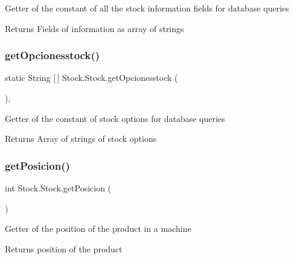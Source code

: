 Getter of the constant of all the stock information fields for database queries

\begin{DoxyReturn}{Returns}
Fields of information as array of strings 
\end{DoxyReturn}
\mbox{\label{class_stock_1_1_stock_a9418c579ab8866675c103afb3908133e}} 
\subsubsection{\texorpdfstring{get\+Opcionesstock()}{getOpcionesstock()}}
{\footnotesize\ttfamily static String \mbox{[}$\,$\mbox{]} Stock.\+Stock.\+get\+Opcionesstock (\begin{DoxyParamCaption}{ }\end{DoxyParamCaption})\hspace{0.3cm}{\ttfamily [inline]}, {\ttfamily [static]}}

Getter of the constant of stock options for database queries

\begin{DoxyReturn}{Returns}
Array of strings of stock options 
\end{DoxyReturn}
\mbox{\label{class_stock_1_1_stock_aaf8aeb342fb5a0fc05f80a23d03dd5e4}} 
\subsubsection{\texorpdfstring{get\+Posicion()}{getPosicion()}}
{\footnotesize\ttfamily int Stock.\+Stock.\+get\+Posicion (\begin{DoxyParamCaption}{ }\end{DoxyParamCaption})\hspace{0.3cm}{\ttfamily [inline]}}

Getter of the position of the product in a machine

\begin{DoxyReturn}{Returns}
position of the product 
\end{DoxyReturn}
\mbox{\label{class_stock_1_1_stock_aaba40908c8c5d06d27e39c3f0c57ba07}} 
